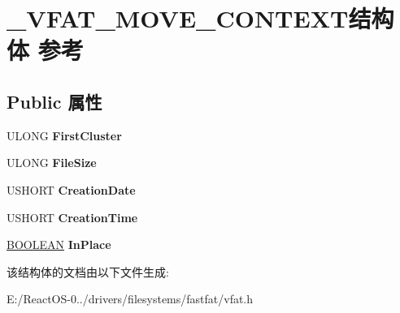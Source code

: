 \hypertarget{struct___v_f_a_t___m_o_v_e___c_o_n_t_e_x_t}{}\section{\+\_\+\+V\+F\+A\+T\+\_\+\+M\+O\+V\+E\+\_\+\+C\+O\+N\+T\+E\+X\+T结构体 参考}
\label{struct___v_f_a_t___m_o_v_e___c_o_n_t_e_x_t}
\subsection*{Public 属性}
\begin{DoxyCompactItemize}
\item 
\mbox{\label{struct___v_f_a_t___m_o_v_e___c_o_n_t_e_x_t_a97e7c24f92d841f90464d95d9655d104}} 
U\+L\+O\+NG {\bfseries First\+Cluster}
\item 
\mbox{\label{struct___v_f_a_t___m_o_v_e___c_o_n_t_e_x_t_aaf0d945d948fbd542e3b733065985364}} 
U\+L\+O\+NG {\bfseries File\+Size}
\item 
\mbox{\label{struct___v_f_a_t___m_o_v_e___c_o_n_t_e_x_t_a37aa5632b01fe440ff0887be37ee9d33}} 
U\+S\+H\+O\+RT {\bfseries Creation\+Date}
\item 
\mbox{\label{struct___v_f_a_t___m_o_v_e___c_o_n_t_e_x_t_ae34e95a38d911ed7e8c33cd293fa05ba}} 
U\+S\+H\+O\+RT {\bfseries Creation\+Time}
\item 
\mbox{\label{struct___v_f_a_t___m_o_v_e___c_o_n_t_e_x_t_afcb95310fc3b7a87d9b47d3ea6e0b579}} 
\hyperlink{_processor_bind_8h_a112e3146cb38b6ee95e64d85842e380a}{B\+O\+O\+L\+E\+AN} {\bfseries In\+Place}
\end{DoxyCompactItemize}


该结构体的文档由以下文件生成\+:\begin{DoxyCompactItemize}
\item 
E\+:/\+React\+O\+S-\/0../drivers/filesystems/fastfat/vfat.\+h\end{DoxyCompactItemize}
